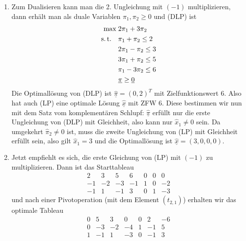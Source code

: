 \documentclass[11pt,german,a4paper,parskip=half-]{scrartcl}
\renewcommand{\u}[1]{\ensuremath{\underline{#1}}} %
\begin{document}
\begin{solution}[2+2 Punkte]
 \begin{enumerate}
  \item Zum Dualisieren kann man die 2. Ungleichung mit $(-1)$ multiplizieren, dann erhält man als duale Variablen $\pi_1, \pi_2 \geq 0$ und (DLP) ist
\begin{align*}
 \max\;&2\pi_1 + 3 \pi_2\\
\st\quad&\pi_1+\pi_2 \leq 2\\
&2\pi_1 -\pi_2 \leq 3\\
&3 \pi_1 + \pi_2 \leq 5\\
&\pi_1 - 3\pi_2 \leq 6\\
&\u \pi \geq \u 0
\end{align*}
Die Optimallösung von (DLP) ist $\hat{\u{\pi}} = (0,2)^T$ mit Zielfunktionswert $6$. Also hat auch (LP) eine optimale Lösung $\hat{\u x}$ mit ZFW $6$. Diese bestimmen wir nun mit dem Satz vom komplementären
Schlupf: $\hat{\u \pi}$ erfüllt nur die erste Ungleichung von (DLP) mit Gleichheit, also kann nur $\hat x_1 \neq 0$ sein. Da umgekehrt $\hat\pi_2 \neq 0$ ist, muss die zweite Ungleichung von (LP) mit Gleichheit
erfüllt sein, also gilt $\hat x_1 = 3$ und die Optimallösung ist $\u{\hat x} = (3,0,0,0)$.
\item Jetzt empfiehlt es sich, die erste Gleichung von (LP) mit $(-1)$ zu multiplizieren. Dann ist das Starttableau
\[\begin{array}{rrrrrr|r}
   2&3&5&6&0&0&0\\\hline
   -1&-2&-3&-1&1&0&-2\\
   -1&1&-1&3&0&1&-3
  \end{array}\]
und nach einer Pivotoperation (mit dem Element $(t_{2,1})$) erhalten wir das optimale Tableau
\[\begin{array}{rrrrrr|r}
   0&5&3&0&0&2&-6\\\hline
   0&-3&-2&-4&1&-1&5\\
   1&-1&1&-3&0&-1&3
  \end{array}\]
 \end{enumerate}
\end{solution}
\end{document}
